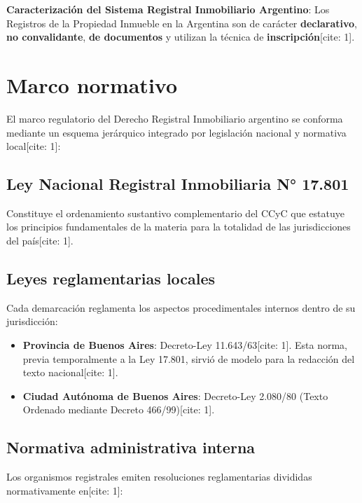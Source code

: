 \documentclass[12pt,oneside]{book}
\begin{document}
\begin{important}
\textbf{Caracterización del Sistema Registral Inmobiliario Argentino}:
Los Registros de la Propiedad Inmueble en la Argentina son de carácter \textbf{declarativo}, \textbf{no convalidante}, \textbf{de documentos} y utilizan la técnica de \textbf{inscripción}[cite: 1].
\end{important}

\section{Marco normativo}

El marco regulatorio del Derecho Registral Inmobiliario argentino se conforma mediante un esquema jerárquico integrado por legislación nacional y normativa local[cite: 1]:

\subsection{Ley Nacional Registral Inmobiliaria N° 17.801}

Constituye el ordenamiento sustantivo complementario del CCyC que estatuye los principios fundamentales de la materia para la totalidad de las jurisdicciones del país[cite: 1].

\subsection{Leyes reglamentarias locales}

Cada demarcación reglamenta los aspectos procedimentales internos dentro de su jurisdicción:

\begin{itemize}
    \item \textbf{Provincia de Buenos Aires}: Decreto-Ley 11.643/63[cite: 1]. Esta norma, previa temporalmente a la Ley 17.801, sirvió de modelo para la redacción del texto nacional[cite: 1].
    \item \textbf{Ciudad Autónoma de Buenos Aires}: Decreto-Ley 2.080/80 (Texto Ordenado mediante Decreto 466/99)[cite: 1].
\end{itemize}

\subsection{Normativa administrativa interna}

Los organismos registrales emiten resoluciones reglamentarias divididas normativamente en[cite: 1]:
\end{document}
